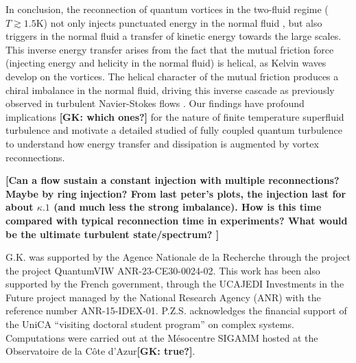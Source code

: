 \documentclass[%
 reprint,
 amsmath,amssymb,
 aps,
 prl,
]{revtex4-2}
\newcommand*{\NOTE}[1]{\textbf{\color{red}[#1]}}
\begin{document}
In conclusion, the reconnection of quantum vortices in the two-fluid regime
($T\gtrsim 1.5$K) not only injects punctuated
energy in the normal fluid \cite{stasiak2024quantum}, but also triggers in the normal fluid
a transfer of kinetic energy towards the large scales. This inverse 
energy transfer arises from the fact that the mutual friction force (injecting energy and 
helicity in the normal fluid) is helical, as Kelvin waves develop on the vortices.
The helical character of the mutual friction produces a chiral imbalance in the normal fluid, driving this inverse cascade as previously observed in turbulent Navier-Stokes flows
\cite{biferaleInverseEnergyCascade2012a,plunianInverseCascadeEnergy2020a}.
Our findings have profound implications \NOTE{GK: which ones?} for the nature of finite temperature superfluid turbulence and motivate a detailed studied of fully coupled quantum turbulence to understand how energy transfer and dissipation is augmented by vortex reconnections.

\NOTE{Can a flow sustain a constant injection with multiple reconnections? Maybe by ring injection? From last peter's plots, the injection last for about $\kappa .1$ (and much less the strong imbalance). How is this time compared with typical reconnection time in experiments? What would be the ultimate turbulent state/spectrum?  }



\begin{acknowledgments}
    G.K. was supported by the Agence Nationale de la Recherche through the project the project QuantumVIW ANR-23-CE30-0024-02.
    This work has been also supported by the French government, through the UCAJEDI Investments in the Future project managed by the National Research Agency (ANR) with the reference number ANR-15-IDEX-01. P.Z.S. acknowledges the financial support of the UniCA ``visiting doctoral student program'' on complex systems. Computations were carried out at the Mésocentre SIGAMM hosted at the Observatoire de la Côte d’Azur\NOTE{GK: true?}.

  \end{acknowledgments}


\end{document}
